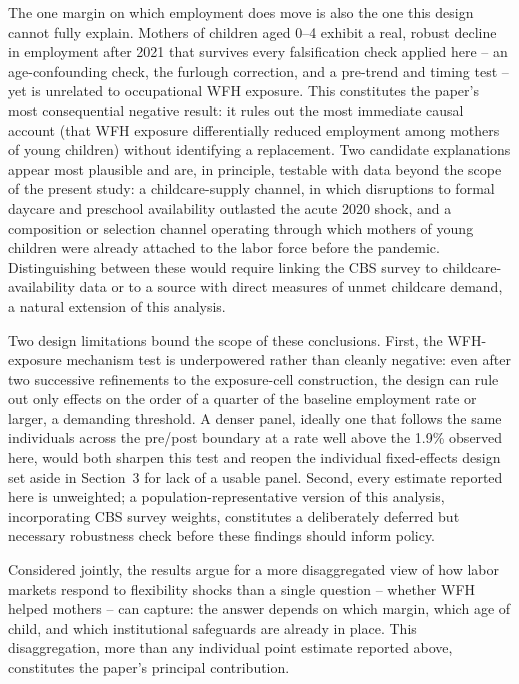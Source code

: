 \documentclass[11pt]{article}
\begin{document}
The one margin on which employment does move is also the one this design cannot fully explain. Mothers of children aged 0--4 exhibit a real, robust decline in employment after 2021 that survives every falsification check applied here -- an age-confounding check, the furlough correction, and a pre-trend and timing test -- yet is unrelated to occupational WFH exposure. This constitutes the paper's most consequential negative result: it rules out the most immediate causal account (that WFH exposure differentially reduced employment among mothers of young children) without identifying a replacement. Two candidate explanations appear most plausible and are, in principle, testable with data beyond the scope of the present study: a childcare-supply channel, in which disruptions to formal daycare and preschool availability outlasted the acute 2020 shock, and a composition or selection channel operating through which mothers of young children were already attached to the labor force before the pandemic. Distinguishing between these would require linking the CBS survey to childcare-availability data or to a source with direct measures of unmet childcare demand, a natural extension of this analysis.

Two design limitations bound the scope of these conclusions. First, the WFH-exposure mechanism test is underpowered rather than cleanly negative: even after two successive refinements to the exposure-cell construction, the design can rule out only effects on the order of a quarter of the baseline employment rate or larger, a demanding threshold. A denser panel, ideally one that follows the same individuals across the pre/post boundary at a rate well above the 1.9\% observed here, would both sharpen this test and reopen the individual fixed-effects design set aside in Section~3 for lack of a usable panel. Second, every estimate reported here is unweighted; a population-representative version of this analysis, incorporating CBS survey weights, constitutes a deliberately deferred but necessary robustness check before these findings should inform policy.

Considered jointly, the results argue for a more disaggregated view of how labor markets respond to flexibility shocks than a single question -- whether WFH helped mothers -- can capture: the answer depends on which margin, which age of child, and which institutional safeguards are already in place. This disaggregation, more than any individual point estimate reported above, constitutes the paper's principal contribution.
\end{document}

